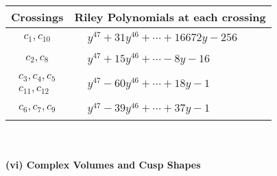 \documentclass[1p]{elsarticle_modified}
\theoremstyle{definition}
\begin{document}
\begin{tabular}{m{50pt}|m{274pt}}
Crossings & \hspace{64pt}Riley Polynomials at each crossing \\
\hline $$\begin{aligned}c_{1},c_{10}\end{aligned}$$&$\begin{aligned}
&y^{47}+31 y^{46}+\cdots+16672 y-256
\end{aligned}$\\
\hline $$\begin{aligned}c_{2},c_{8}\end{aligned}$$&$\begin{aligned}
&y^{47}+15 y^{46}+\cdots-8 y-16
\end{aligned}$\\
\hline $$\begin{aligned}c_{3},c_{4},c_{5}\\c_{11},c_{12}\end{aligned}$$&$\begin{aligned}
&y^{47}-60 y^{46}+\cdots+18 y-1
\end{aligned}$\\
\hline $$\begin{aligned}c_{6},c_{7},c_{9}\end{aligned}$$&$\begin{aligned}
&y^{47}-39 y^{46}+\cdots+37 y-1
\end{aligned}$\\
\hline
\end{tabular}\\~\\
\newpage\flushleft \textbf{(vi) Complex Volumes and Cusp Shapes}
\end{document}
